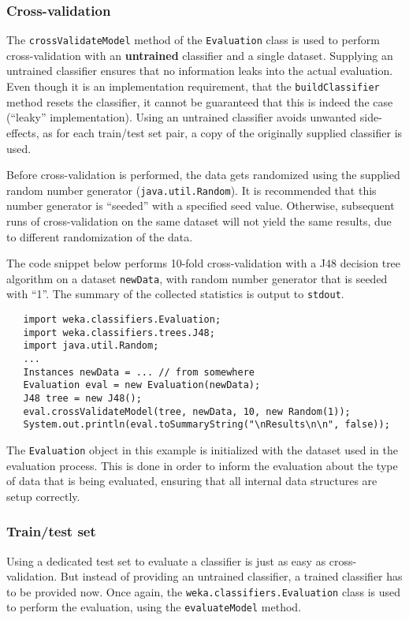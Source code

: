 \subsubsection*{Cross-validation}
The \texttt{crossValidateModel} method of the \texttt{Evaluation} class is used
to perform cross-validation with an \textbf{untrained} classifier and a single
dataset. Supplying an untrained classifier ensures that no information leaks
into the actual evaluation. Even though it is an implementation requirement,
that the \texttt{buildClassifier} method resets the classifier, it cannot be
guaranteed that this is indeed the case (``leaky'' implementation). Using an
untrained classifier avoids unwanted side-effects, as for each train/test set
pair, a copy of the originally supplied classifier is used.

Before cross-validation is performed, the data gets randomized using the
supplied random number generator (\texttt{java.util.Random}). It is
recommended that this number generator is ``seeded'' with a specified seed
value. Otherwise, subsequent runs of cross-validation on the same dataset will
not yield the same results, due to different randomization of the data.

The code snippet below performs 10-fold cross-validation with a J48 decision
tree algorithm on a dataset \texttt{newData}, with random number generator that
is seeded with ``1''. The summary of the collected statistics is output to
\texttt{stdout}.

\newpage

\begin{verbatim}
   import weka.classifiers.Evaluation;
   import weka.classifiers.trees.J48;
   import java.util.Random;
   ...
   Instances newData = ... // from somewhere
   Evaluation eval = new Evaluation(newData);
   J48 tree = new J48();
   eval.crossValidateModel(tree, newData, 10, new Random(1));
   System.out.println(eval.toSummaryString("\nResults\n\n", false));
\end{verbatim}
The \texttt{Evaluation} object in this example is initialized with the dataset
used in the evaluation process. This is done in order to inform the evaluation
about the type of data that is being evaluated, ensuring that all internal data
structures are setup correctly.

\subsubsection*{Train/test set}
Using a dedicated test set to evaluate a classifier is just as easy as
cross-validation. But instead of providing an untrained classifier, a trained
classifier has to be provided now. Once again, the
\texttt{weka.classifiers.Evaluation} class is used to perform the evaluation,
using the \texttt{evaluateModel} method.

